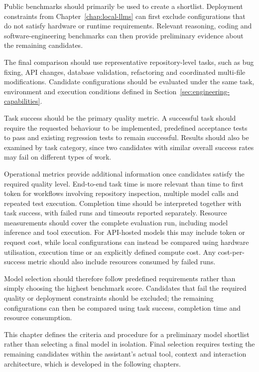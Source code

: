 Public benchmarks should primarily be used to create a shortlist. Deployment constraints from Chapter~\ref{chap:local-llms} can first exclude configurations that do not satisfy hardware or runtime requirements. Relevant reasoning, coding and software-engineering benchmarks can then provide preliminary evidence about the remaining candidates.

The final comparison should use representative repository-level tasks, such as bug fixing, API changes, database validation, refactoring and coordinated multi-file modifications. Candidate configurations should be evaluated under the same task, environment and execution conditions defined in Section~\ref{sec:engineering-capabilities}.

Task success should be the primary quality metric. A successful task should require the requested behaviour to be implemented, predefined acceptance tests to pass and existing regression tests to remain successful. Results should also be examined by task category, since two candidates with similar overall success rates may fail on different types of work.

Operational metrics provide additional information once candidates satisfy the required quality level. End-to-end task time is more relevant than time to first token for workflows involving repository inspection, multiple model calls and repeated test execution. Completion time should be interpreted together with task success, with failed runs and timeouts reported separately. Resource measurements should cover the complete evaluation run, including model inference and tool execution. For API-hosted models this may include token or request cost, while local configurations can instead be compared using hardware utilisation, execution time or an explicitly defined compute cost. Any cost-per-success metric should also include resources consumed by failed runs.

Model selection should therefore follow predefined requirements rather than simply choosing the highest benchmark score. Candidates that fail the required quality or deployment constraints should be excluded; the remaining configurations can then be compared using task success, completion time and resource consumption.

This chapter defines the criteria and procedure for a preliminary model shortlist rather than selecting a final model in isolation. Final selection requires testing the remaining candidates within the assistant's actual tool, context and interaction architecture, which is developed in the following chapters.

